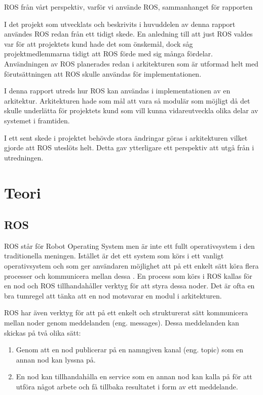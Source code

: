 ROS från vårt perspektiv, varför vi använde ROS, sammanhanget för rapporten

I det projekt som utvecklats och beskrivits i huvuddelen av denna rapport användes ROS redan från ett tidigt skede. En anledning till att just ROS valdes var för att projektets kund hade det som önskemål, dock såg projektmedlemmarna tidigt att ROS förde med sig många fördelar. Användningen av ROS planerades redan i arkitekturen som är utformad helt med förutsättningen att ROS skulle användas för implementationen.

I denna rapport utreds hur ROS kan användas i implementationen av en arkitektur. Arkitekturen hade som mål att vara så modulär som möjligt då det skulle underlätta för projektets kund som vill kunna vidareutveckla olika delar av systemet i framtiden.

I ett sent skede i projektet behövde stora ändringar göras i arkitekturen vilket gjorde att ROS uteslöts helt. Detta gav ytterligare ett perspektiv att utgå från i utredningen.


\section{Teori}
\label{sec:theory-lundberg}

\subsection{ROS}
ROS står för Robot Operating System men är inte ett fullt operativsystem i den traditionella meningen. Istället är det ett system som körs i ett vanligt operativsystem och som ger användaren möjlighet att på ett enkelt sätt köra flera processer och kommunicera mellan dessa \cite{quigley2009ros}. En process som körs i ROS kallas för en nod och ROS tillhandahåller verktyg för att styra dessa noder. Det är ofta en bra tumregel att tänka att en nod motsvarar en modul i arkitekturen.

ROS har även verktyg för att på ett enkelt och strukturerat sätt kommunicera mellan noder genom meddelanden (eng. messages). Dessa meddelanden kan skickas på två olika sätt:

\begin{enumerate}
	\item Genom att en nod publicerar på en namngiven kanal (eng. topic) som en annan nod kan lyssna på.
	
	\item En nod kan tillhandahålla en service som en annan nod kan kalla på för att utföra något arbete och få tillbaka resultatet i form av ett meddelande.
\end{enumerate}

